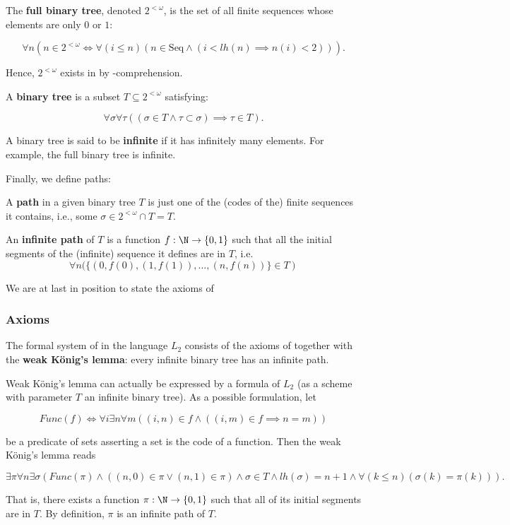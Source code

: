 \documentclass[../main.tex]{memoir}
\begin{document}
\begin{definition}[Trees]
  The \textbf{full binary tree}, denoted $2^{<\omega}$, is the set of all finite sequences whose elements are only $0$ or $1$:

  \[ \forall n (n \in 2^{<\omega} \iff \forall (i \le n) (n \in \text{Seq} \land (i < lh(n) \implies n(i) < 2))). \]

  Hence, $2^{<\omega}$ exists in \rca by -comprehension.

  A \textbf{binary tree} is a subset $T \subseteq 2^{<\omega}$ satisfying:

  \[ \forall \sigma \forall \tau ((\sigma \in T \land \tau \subset \sigma) \implies \tau \in T). \]

  A binary tree is said to be \textbf{infinite} if it has infinitely many elements. For example, the full binary tree is infinite.
\end{definition}

Finally, we define paths:

\begin{definition}
  A \textbf{path} in a given binary tree $T$ is just one of the (codes of the) finite sequences it contains, i.e., some $\sigma \in 2^{<\omega} \cap T = T$.

  An \textbf{infinite path} of $T$ is a function $f: \N \to \{0, 1\}$ such that all the initial segments of the (infinite) sequence it defines are in $T$, i.e.
  \[ \forall n (\{(0, f(0), (1, f(1)), \ldots, (n, f(n))\} \in T) \]
\end{definition}

We are at last in position to state the axioms of \wkl

\subsubsection{Axioms}

\begin{definition}
  The formal system of \wkl in the language $L_2$ consists of the axioms of \rca together with the \textbf{weak König's lemma}: every infinite binary tree has an infinite path.
\end{definition}

\begin{remark}
  \label{remark:wkl-formalization}
  Weak König's lemma can actually be expressed by a formula of $L_2$ (as a scheme with parameter $T$ an infinite binary tree). As a possible formulation, let

  \[ Func(f) \iff \forall i \exists n \forall m ((i, n) \in f \land ((i, m) \in f \implies n = m)) \]

  be a predicate of sets asserting a set is the code of a function. Then the weak König's lemma reads

  \[ \exists \pi \forall n \exists \sigma (Func(\pi) \land ((n, 0) \in \pi \lor (n, 1) \in \pi) \land \sigma \in T \land lh(\sigma) = n + 1 \land \forall(k \le n) (\sigma(k) = \pi(k))). \]

  That is, there exists a function $\pi: \N \to \{0, 1\}$ such that all of its initial segments are in $T$. By definition, $\pi$ is an infinite path of $T$.
\end{remark}
\end{document}
